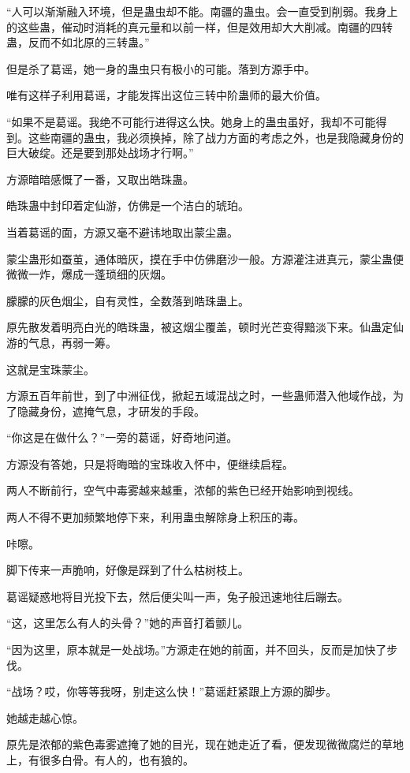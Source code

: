 \begin{this_body}
“人可以渐渐融入环境，但是蛊虫却不能。南疆的蛊虫。会一直受到削弱。我身上的这些蛊，催动时消耗的真元量和以前一样，但是效用却大大削减。南疆的四转蛊，反而不如北原的三转蛊。”

但是杀了葛谣，她一身的蛊虫只有极小的可能。落到方源手中。

唯有这样子利用葛谣，才能发挥出这位三转中阶蛊师的最大价值。

“如果不是葛谣。我绝不可能行进得这么快。她身上的蛊虫虽好，我却不可能得到。这些南疆的蛊虫，我必须换掉，除了战力方面的考虑之外，也是我隐藏身份的巨大破绽。还是要到那处战场才行啊。”

方源暗暗感慨了一番，又取出皓珠蛊。

皓珠蛊中封印着定仙游，仿佛是一个洁白的琥珀。

当着葛谣的面，方源又毫不避讳地取出蒙尘蛊。

蒙尘蛊形如蚕茧，通体暗灰，摸在手中仿佛磨沙一般。方源灌注进真元，蒙尘蛊便微微一炸，爆成一蓬琐细的灰烟。

朦朦的灰色烟尘，自有灵性，全数落到皓珠蛊上。

原先散发着明亮白光的皓珠蛊，被这烟尘覆盖，顿时光芒变得黯淡下来。仙蛊定仙游的气息，再弱一筹。

这就是宝珠蒙尘。

方源五百年前世，到了中洲征伐，掀起五域混战之时，一些蛊师潜入他域作战，为了隐藏身份，遮掩气息，才研发的手段。

“你这是在做什么？”一旁的葛谣，好奇地问道。

方源没有答她，只是将晦暗的宝珠收入怀中，便继续启程。

两人不断前行，空气中毒雾越来越重，浓郁的紫色已经开始影响到视线。

两人不得不更加频繁地停下来，利用蛊虫解除身上积压的毒。

咔嚓。

脚下传来一声脆响，好像是踩到了什么枯树枝上。

葛谣疑惑地将目光投下去，然后便尖叫一声，兔子般迅速地往后蹦去。

“这，这里怎么有人的头骨？”她的声音打着颤儿。

“因为这里，原本就是一处战场。”方源走在她的前面，并不回头，反而是加快了步伐。

“战场？哎，你等等我呀，别走这么快！”葛谣赶紧跟上方源的脚步。

她越走越心惊。

原先是浓郁的紫色毒雾遮掩了她的目光，现在她走近了看，便发现微微腐烂的草地上，有很多白骨。有人的，也有狼的。


\end{this_body}
